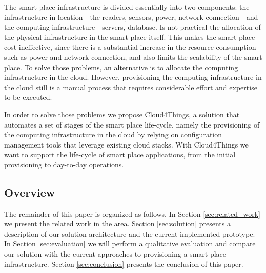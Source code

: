 The smart place infrastructure is divided essentially into two components: the infrastructure in location -
the readers, sensors, power, network connection - and the computing infrastructure - servers, database.
Is not practical the allocation of the physical infrastructure in the smart place itself. This makes the smart place
cost ineffective, since there is a substantial increase in the resource consumption such as power and network
connection, and also limits the scalability of the smart place. To solve those problems, an alternative is to
allocate the computing infrastructure in the cloud. However, provisioning the computing infrastructure in
the cloud still is a manual process that requires considerable effort and expertise
to be executed.

In order to solve those problems we propose Cloud4Things, a solution that automates a set of stages of the smart
place life-cycle, namely the provisioning of the computing infrastructure in the cloud by relying on configuration
management tools that leverage existing cloud stacks. With Cloud4Things we want to support the life-cycle of smart place
applications, from the initial provisioning to day-to-day operations.

\subsection{Overview}
\label{sub:overview}
The remainder of this paper is organized as follows. In Section \ref{sec:related_work} we
present the related work in the area. Section \ref{sec:solution} presents a description of our
solution architecture and the current implemented prototype. In Section \ref{sec:evaluation}
we will perform a qualitative evaluation and compare our solution with the current approaches to provisioning
a smart place infrastructure. Section \ref{sec:conclusion} presents the conclusion of this paper.
